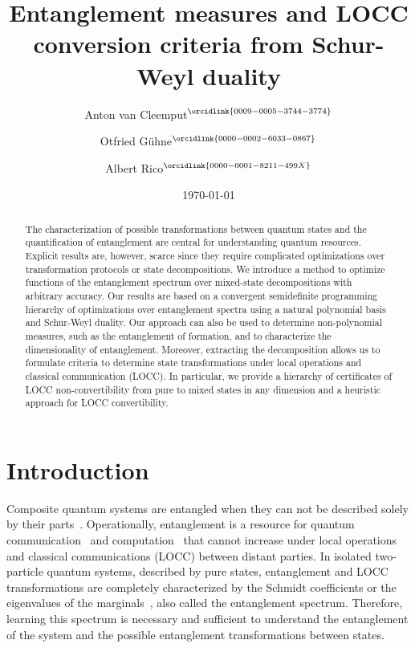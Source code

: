 \documentclass[aps,pra,twocolumn,showpacs,superscriptaddress,groupedaddress]{revtex4-2}
\begin{document}
\title{
Entanglement measures and LOCC conversion criteria from Schur-Weyl duality
}

\author{Anton van Cleemput$^{\orcidlink{0009-0005-3744-3774}}$}
\author{Otfried Gühne$^{\orcidlink{0000-0002-6033-0867}}$}
\author{Albert Rico$^{\orcidlink{0000-0001-8211-499X}}$}




\date{\today}
\begin{abstract}
The characterization of possible transformations between quantum states and the quantification of entanglement are central for understanding quantum resources. Explicit results are, however, scarce since they require complicated optimizations over transformation protocols or state decompositions. We introduce a method to optimize functions of the
entanglement spectrum over mixed-state decompositions with arbitrary accuracy. Our results are based on a convergent semidefinite programming hierarchy of optimizations over entanglement spectra using a natural polynomial basis and Schur-Weyl duality. Our approach can also be used 
to determine non-polynomial measures, such as the entanglement of formation,
and to characterize the dimensionality of entanglement. 
Moreover, extracting the decomposition allows us to formulate  
criteria to determine state transformations under local operations
and classical communication (LOCC). In particular, 
we provide a hierarchy of certificates of LOCC non-convertibility 
from pure to mixed states in any dimension and a heuristic approach 
for LOCC convertibility.
\end{abstract}

\maketitle
\section{Introduction}
Composite quantum systems are entangled when they can not be described solely by their parts~\cite{epr}. Operationally, entanglement is a resource for quantum communication~\cite{distributed, eckert} and computation~\cite{one-way, shor} that cannot increase under local operations and classical communications (LOCC) between distant parties.
In isolated two-particle quantum systems, described by pure states, entanglement and LOCC transformations are completely characterized by 
the Schmidt coefficients or the eigenvalues of the marginals~\cite{Nielsen1999MajLOCC, Vidal_2000}, also called 
the entanglement spectrum. Therefore, learning this spectrum is 
necessary and sufficient to understand the entanglement of the 
system and the possible entanglement transformations between 
states.
\end{document}
